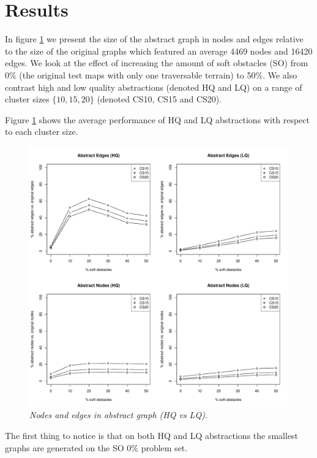 \section{Results}
In figure \ref{aha-fig:graphsize} we present the size of the abstract graph in nodes and edges relative to the size of the original graphs which featured an average 4469 nodes and 16420 edges. 
We look at the effect of increasing the amount of soft obstacles (SO) from 0\% (the original test maps with only one traversable terrain) to 50\%.
We also contrast high and low quality abstractions (denoted HQ and LQ) on a range of cluster sizes $\lbrace 10, 15, 20 \rbrace$ (denoted CS10, CS15 and CS20).
\par \indent
Figure \ref{aha-fig:graphsize} shows the average performance of HQ and LQ abstractions with respect to each cluster size. 
\begin{figure}[htbp]
       \caption{\small{\emph{Nodes and edges in abstract graph (HQ vs LQ). }}}
       \begin{center}
                       \includegraphics[scale=0.35]{diagrams/graphsize.pdf}
       \end{center}
       \label{aha-fig:graphsize}
\end{figure}
%
The first thing to notice is that on both HQ and LQ abstractions the smallest graphs are generated on the SO 0\% problem set. 
